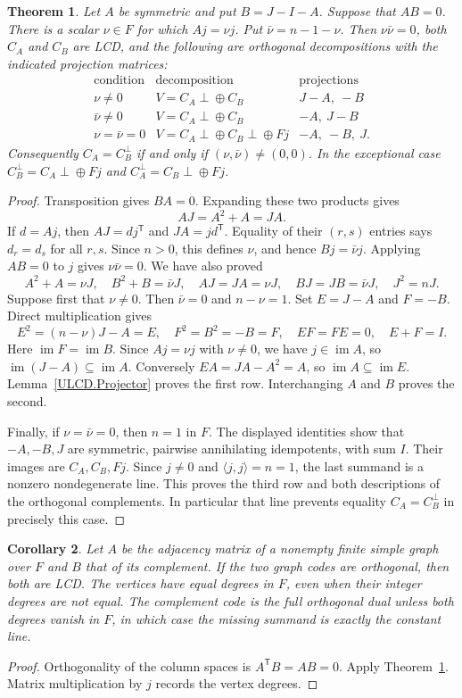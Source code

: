 \documentclass[11pt,a4paper]{article}
\newtheorem{theorem}{Theorem}[section]
\newtheorem{corollary}[theorem]{Corollary}
\numberwithin{equation}{section}
\newcommand{\im}{\operatorname{im}}
\begin{document}
\begin{theorem}\label{ULCD.Complement}
Let $A$ be symmetric and put $B=J-I-A$. Suppose that $AB=0$.
There is a scalar $\nu\in F$ for which $Aj=\nu j$.
Put $\bar\nu=n-1-\nu$. Then $\nu\bar\nu=0$, both $C_A$ and $C_B$
are LCD, and the following are orthogonal decompositions with the indicated
projection matrices:
\[
\begin{array}{c|c|c}
\text{condition}&\text{decomposition}&\text{projections}\\\hline
\nu\ne0&V=C_A\perp\!\oplus C_B&J-A,\ -B\\
\bar\nu\ne0&V=C_A\perp\!\oplus C_B&-A,\ J-B\\
\nu=\bar\nu=0&V=C_A\perp\!\oplus C_B\perp\!\oplus Fj&-A,\ -B,\ J.
\end{array}
\]
Consequently $C_A=C_B^\perp$ if and only if $(\nu,\bar\nu)\ne(0,0)$.
In the exceptional case $C_B^\perp=C_A\perp\!\oplus Fj$ and
$C_A^\perp=C_B\perp\!\oplus Fj$.
\end{theorem}
\begin{proof}
Transposition gives $BA=0$. Expanding these two products gives
\[
 AJ=A^2+A=JA.
\]
If $d=Aj$, then $AJ=dj^{\mathsf T}$ and $JA=jd^{\mathsf T}$.
Equality of their $(r,s)$ entries says $d_r=d_s$ for all $r,s$.
Since $n>0$, this defines $\nu$, and hence $Bj=\bar\nu j$.
Applying $AB=0$ to $j$ gives $\nu\bar\nu=0$. We have also proved
\[
 A^2+A=\nu J,\quad B^2+B=\bar\nu J,\quad
 AJ=JA=\nu J,\quad BJ=JB=\bar\nu J,\quad J^2=nJ.
\]
Suppose first that $\nu\ne0$. Then $\bar\nu=0$ and $n-\nu=1$.
Set $E=J-A$ and $F=-B$. Direct multiplication gives
\[
 E^2=(n-\nu)J-A=E,\quad F^2=B^2=-B=F,\quad
 EF=FE=0,\quad E+F=I.
\]
Here $\im F=\im B$. Since $Aj=\nu j$ with $\nu\ne0$, we have
$j\in\im A$, so $\im(J-A)\subseteq\im A$.
Conversely $EA=JA-A^2=A$, so $\im A\subseteq\im E$.
Lemma~\ref{ULCD.Projector} proves the first row. Interchanging $A$ and $B$
proves the second.

Finally, if $\nu=\bar\nu=0$, then $n=1$ in $F$.
The displayed identities show that $-A,-B,J$ are symmetric, pairwise
annihilating idempotents, with sum $I$. Their images are $C_A,C_B,Fj$.
Since $j\ne0$ and $\langle j,j\rangle=n=1$, the last summand is a
nonzero nondegenerate line. This proves the third row and both descriptions
of the orthogonal complements. In particular that line prevents equality
$C_A=C_B^\perp$ in precisely this case.
\end{proof}

\begin{corollary}\label{ULCD.Graph}
Let $A$ be the adjacency matrix of a nonempty finite simple graph over $F$
and $B$ that of its complement. If the two graph codes are orthogonal,
then both are LCD. The vertices have equal degrees in $F$, even when their
integer degrees are not equal. The complement code is the full orthogonal
dual unless both degrees vanish in $F$, in which case the missing summand
is exactly the constant line.
\end{corollary}
\begin{proof}
Orthogonality of the column spaces is $A^{\mathsf T}B=AB=0$.
Apply Theorem~\ref{ULCD.Complement}. Matrix multiplication by $j$ records
the vertex degrees.
\end{proof}
\end{document}
